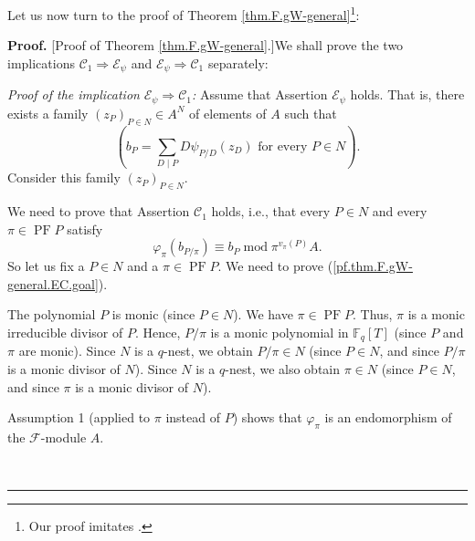 \documentclass[numbers=enddot,12pt,final,onecolumn,notitlepage]{scrartcl}%
\theoremstyle{definition}
\newenvironment{proof}[1][Proof]{\noindent\textbf{#1.} }{\ \rule{0.5em}{0.5em}}
\let\sumnonlimits\sum
\renewcommand{\sum}{\sumnonlimits\limits}
\begin{document}
Let us now turn to the proof of Theorem \ref{thm.F.gW-general}\footnote{Our
proof imitates \cite[solution to Exercise 2.9.6]{reiner-hopf}.}:

\begin{proof}
[Proof of Theorem \ref{thm.F.gW-general}.]We shall prove the two implications
$\mathcal{C}_{1}\Longrightarrow\mathcal{E}_{\psi}$ and $\mathcal{E}_{\psi
}\Longrightarrow\mathcal{C}_{1}$ separately:

\textit{Proof of the implication }$\mathcal{E}_{\psi}\Longrightarrow
\mathcal{C}_{1}$\textit{:} Assume that Assertion $\mathcal{E}_{\psi}$ holds.
That is, there exists a family $\left(  z_{P}\right)  _{P\in N}\in A^{N}$ of
elements of $A$ such that%
\begin{equation}
\left(  b_{P}=\sum_{D\mid P}D\psi_{P / D}\left(  z_{D}\right)  \text{ for
every }P\in N\right)  . \label{pf.thm.F.gW-general.EC.ass}%
\end{equation}
Consider this family $\left(  z_{P}\right)  _{P\in N}$.

We need to prove that Assertion $\mathcal{C}_{1}$ holds, i.e., that every
$P\in N$ and every $\pi\in\operatorname{PF}P$ satisfy%
\begin{equation}
\varphi_{\pi}\left(  b_{P / \pi}\right)  \equiv b_{P}\operatorname{mod}%
\pi^{v_{\pi}\left(  P\right)  }A. \label{pf.thm.F.gW-general.EC.goal}%
\end{equation}
So let us fix a $P\in N$ and a $\pi\in\operatorname*{PF}P$. We need to prove
(\ref{pf.thm.F.gW-general.EC.goal}).

The polynomial $P$ is monic (since $P\in N$). We have $\pi\in
\operatorname*{PF}P$. Thus, $\pi$ is a monic irreducible divisor of $P$.
Hence, $P/\pi$ is a monic polynomial in $\mathbb{F}_{q}\left[  T\right]  $
(since $P$ and $\pi$ are monic). Since $N$ is a $q$-nest, we obtain $P/\pi\in
N$ (since $P\in N$, and since $P/\pi$ is a monic divisor of $N$). Since $N$ is
a $q$-nest, we also obtain $\pi\in N$ (since $P\in N$, and since $\pi$ is a
monic divisor of $N$).

Assumption 1 (applied to $\pi$ instead of $P$) shows that $\varphi_{\pi}$ is
an endomorphism of the $\mathcal{F}$-module $A$.


\end{proof}
\end{document}
